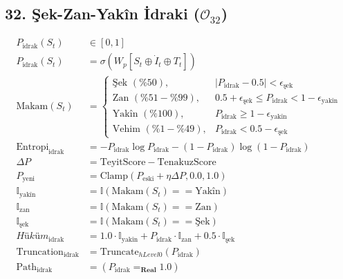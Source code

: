 \documentclass[11pt, a4paper]{article}
\begin{document}
\subsection{32. Şek-Zan-Yakîn İdraki ($\mathcal{O}_{32}$)}
\begin{align}
P_{\text{idrak}}(S_t) &\in [0, 1] \\
P_{\text{idrak}}(S_t) &= \sigma\left( W_p [S_t \oplus \dot{I}_t \oplus T_t] \right) \\
\text{Makam}(S_t) &= 
\begin{cases}
\text{Şek } (\%50), & |P_{\text{idrak}} - 0.5| < \epsilon_{\text{şek}} \\
\text{Zan } (\%51-\%99), & 0.5 + \epsilon_{\text{şek}} \le P_{\text{idrak}} < 1 - \epsilon_{\text{yakîn}} \\
\text{Yakîn } (\%100), & P_{\text{idrak}} \ge 1 - \epsilon_{\text{yakîn}} \\
\text{Vehim } (\%1-\%49), & P_{\text{idrak}} < 0.5 - \epsilon_{\text{şek}}
\end{cases} \\
\text{Entropi}_{\text{idrak}} &= -P_{\text{idrak}} \log P_{\text{idrak}} - (1-P_{\text{idrak}}) \log (1-P_{\text{idrak}}) \\
\Delta P &= \text{TeyitScore} - \text{TenakuzScore} \\
P_{\text{yeni}} &= \text{Clamp}(P_{\text{eski}} + \eta \Delta P, 0.0, 1.0) \\
\mathbb{I}_{\text{yakîn}} &= \mathbb{I}(\text{Makam}(S_t) == \text{Yakîn}) \\
\mathbb{I}_{\text{zan}} &= \mathbb{I}(\text{Makam}(S_t) == \text{Zan}) \\
\mathbb{I}_{\text{şek}} &= \mathbb{I}(\text{Makam}(S_t) == \text{Şek}) \\
Hüküm_{\text{idrak}} &= 1.0 \cdot \mathbb{I}_{\text{yakîn}} + P_{\text{idrak}} \cdot \mathbb{I}_{\text{zan}} + 0.5 \cdot \mathbb{I}_{\text{şek}} \\
\text{Truncation}_{\text{idrak}} &= \text{Truncate}_{hLevel 0}(P_{\text{idrak}}) \\
\text{Path}_{\text{idrak}} &= (P_{\text{idrak}} =_{\mathbf{Real}} 1.0)
\end{align}
\end{document}
